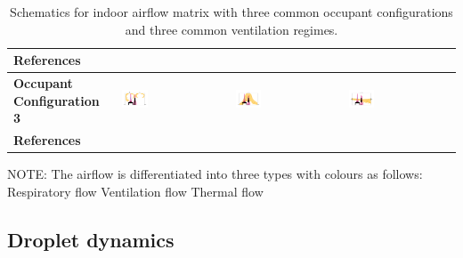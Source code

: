 \documentclass[a4paper,12pt]{elsarticle}
\DeclareRobustCommand{\legendsquare}[1]{%
  \tikz[baseline=(a.south)]{\node[#1, inner sep=.8ex, outer sep=0] (a) {};}%
  }
\begin{document}
\begin{table}[h!]
\begin{tabular}{|m{2.5cm}|m{4cm}|m{4cm}|m{4cm}|}
    \hline
    \textbf{References} & \cite{he2011cfd,yan2021transmission,mirzaie2021covid,li2021effects,shao2021risk,qin2023transmission,xu2023cfd} & \cite{he2011cfd,lu2022ventilation,jain2023numerical} & \cite{ho2021modeling,duill2021impact,ren2022practical,lu2022ventilation} \\
    \hline
    \textbf{Occupant Configuration 3} &\includegraphics[clip,trim={0 2cm 0 2cm},width=0.25\textwidth]{Airflow/mat3.jpeg}& \includegraphics[clip,trim={0 2cm 0 2cm},width=0.25\textwidth]{Airflow/mat6.jpeg}& \includegraphics[clip,trim={0 2cm 0 2cm},width=0.25\textwidth]{Airflow/mat9.jpeg} \\
    \hline
    \textbf{References} & \cite{hang2014influence,romano2015numerical,liu2020full,lu2020reducing,zhou2021experimental,guo2022visualization,liu2023estimating} & \cite{zhou2021experimental,villafruela2019assessment,lu2020reducing} & \cite{jiang2009investigating,lu2020reducing} \\
    \hline
    \end{tabular}
    \caption{Schematics for indoor airflow matrix with three common occupant configurations and three common ventilation regimes.}
    \label{tab:mat}
    \vspace{0.5cm}
    \normalsize
        NOTE: The airflow is differentiated into three types with colours as follows:\\ \legendsquare{fill=resp} Respiratory flow \legendsquare{fill=vent} Ventilation flow \legendsquare{fill=therm} Thermal flow 
\end{table}

    
\subsection{Droplet dynamics}
\end{document}

